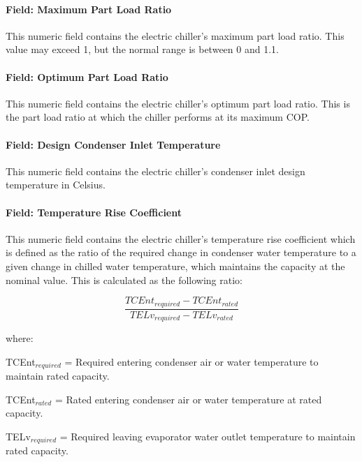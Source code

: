 \paragraph{Field: Maximum Part Load Ratio}\label{field-maximum-part-load-ratio-2}

This numeric field contains the electric chiller's maximum part load ratio. This value may exceed 1, but the normal range is between 0 and 1.1.

\paragraph{Field: Optimum Part Load Ratio}\label{field-optimum-part-load-ratio-2}

This numeric field contains the electric chiller's optimum part load ratio. This is the part load ratio at which the chiller performs at its maximum COP.

\paragraph{Field: Design Condenser Inlet Temperature}\label{field-design-condenser-inlet-temperature-2}

This numeric field contains the electric chiller's condenser inlet design temperature in Celsius.

\paragraph{Field: Temperature Rise Coefficient}\label{field-temperature-rise-coefficient}

This numeric field contains the electric chiller's temperature rise coefficient which is defined as the ratio of the required change in condenser water temperature to a given change in chilled water temperature, which maintains the capacity at the nominal value. This is calculated as the following ratio:

\begin{equation}
    \frac{{TCEn{t_{required}} - TCEn{t_{rated}}}}{{TEL{v_{required}} - TEL{v_{rated}}}}
\end{equation}

where:

TCEnt\(_{required}\) = Required entering condenser air or water temperature to maintain rated capacity.

TCEnt\(_{rated}\) = Rated entering condenser air or water temperature at rated capacity.

TELv\(_{required}\) = Required leaving evaporator water outlet temperature to maintain rated capacity.

